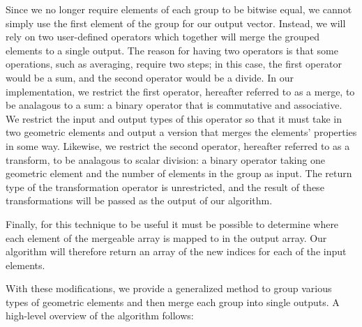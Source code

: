 \documentclass[journal]{vgtc}                %
\begin{document}
Since we no longer require elements of each group to be bitwise
equal, we cannot simply use the first element of the group for our output vector. Instead, we will rely on two user-defined operators
which together will merge the grouped elements to a single output. The reason for having two operators is that some operations, such
as averaging, require two steps; in this case, the first operator would be a sum, and the second operator would be a divide. In our
implementation, we restrict the first operator, hereafter referred to as a merge, to be analagous to a sum: a binary operator that is commutative and associative. We restrict the input and output types of this operator so that it must take in two geometric elements and output a version that merges the elements' properties in some way.
Likewise, we restrict the second operator, hereafter referred to as a transform, to be analagous to scalar division: a binary operator taking one geometric element and the number of elements in the
group as input. The return type of the transformation operator is unrestricted, and the result of these transformations will be passed as the output of our algorithm. 

Finally, for this technique to be useful it must be possible to determine where each element of the mergeable array is mapped to in the output array. 
Our algorithm will therefore return an array of the new indices for each of the input elements.

With these modifications, we provide a generalized method to group various 
types of geometric elements and then merge each group into single outputs. A high-level overview of the algorithm follows:
\end{document}
